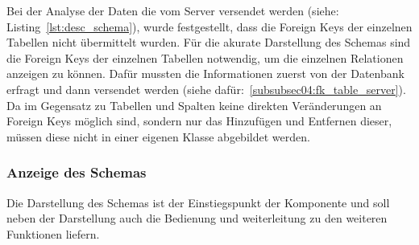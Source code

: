 Bei der Analyse der Daten die vom Server versendet werden (siehe: Listing~\ref{lst:desc_schema}), wurde festgestellt, dass die Foreign Keys der einzelnen Tabellen nicht übermittelt wurden.
Für die akurate Darstellung des Schemas sind die Foreign Keys der einzelnen Tabellen notwendig, um die einzelnen Relationen anzeigen zu können.
Dafür mussten die Informationen zuerst von der Datenbank erfragt und dann versendet werden (siehe dafür:~\ref{subsubsec04:fk_table_server}).
Da im Gegensatz zu Tabellen und Spalten keine direkten Veränderungen an Foreign Keys möglich sind, sondern nur das Hinzufügen und Entfernen dieser, müssen diese nicht in einer eigenen Klasse abgebildet werden.



\subsubsection{Anzeige des Schemas}
\label{subsubsec04:anz_schema}

Die Darstellung des Schemas ist der Einstiegspunkt der Komponente und soll neben der Darstellung auch die Bedienung und weiterleitung zu den weiteren Funktionen liefern.

